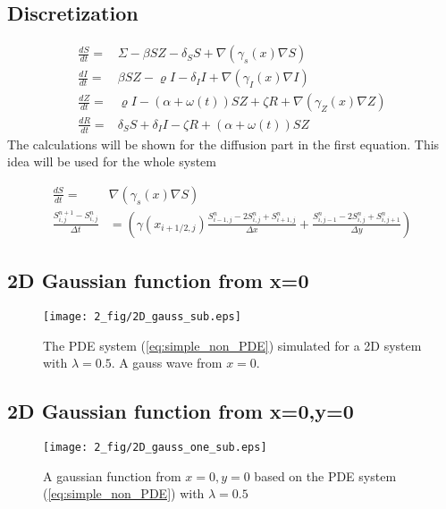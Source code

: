 \documentclass[%
twoside,                 %
final,                   %
chapterprefix=true,      %
open=right               %
10pt]{book}
\begin{document}
\subsection{Discretization}
\begin{equation} \label{eq:LMR_model}
	\begin{aligned} 
	\frac{dS}{dt} =& \Sigma -\beta SZ - \delta_SS + \nabla(\gamma_s(x)\nabla S) \\
	\frac{dI}{dt} =& \beta SZ - \varrho I - \delta_II+\nabla(\gamma_I(x)\nabla I)\\
	\frac{dZ}{dt} =& \varrho I- (\alpha+\omega(t))SZ + \zeta R+ \nabla(\gamma_Z(x)\nabla Z)\\
	\frac{dR}{dt} =& \delta_SS +\delta_II -\zeta R + (\alpha+\omega(t))SZ 
	\end{aligned}
\end{equation}
The calculations will be shown for the diffusion part in the first equation. This idea will be used for the whole system

\begin{equation}
	\begin{aligned}
	\frac{dS}{dt} =& \nabla(\gamma_s(x)\nabla S) \\
    \frac{S^{n+1}_{i,j}-S^n_{i,j}}{\Delta t} &= \left(\gamma(x_{i+1/2,j})\frac{S^{n}_{i-1,j}-2S^{n}_{i,j}+S^{n}_{i+1,j}}{\Delta x}+\frac{S^{n}_{i,j-1}-2S^{n}_{i,j}+S^{n}_{i,j+1}}{\Delta y}\right) 
	\end{aligned}
\end{equation}
\subsection{2D Gaussian function from x=0}


\begin{figure}[ht]
  \centerline{\texttt{[image: 2\_fig/2D\_gauss\_sub.eps]}}
  \caption{
  The PDE system (\ref{eq:simple_non_PDE}) simulated for a 2D system with $\lambda=0.5$. A gauss wave from $x=0$.
  }
\end{figure}


\subsection{2D Gaussian function from x=0,y=0}


\begin{figure}[ht]
  \centerline{\texttt{[image: 2\_fig/2D\_gauss\_one\_sub.eps]}}
  \caption{
  A gaussian function from $x=0,y=0$ based on the PDE system (\ref{eq:simple_non_PDE}) with $\lambda=0.5$
  }
\end{figure}
\end{document}
